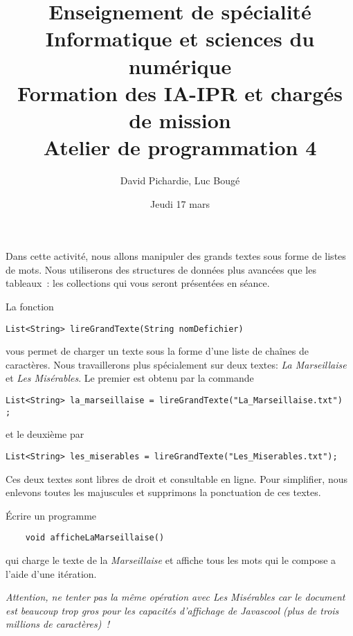 \documentclass[a4paper,11pt]{article}
\newcounter{probleme} \newcounter{question}[probleme]
\def\thequestion{\theprobleme.\arabic{question}}
\newenvironment{question}%
{\refstepcounter{question} \description%
\item[Exercice \thequestion.] \bgroup}%
{\egroup\enddescription}
\newenvironment{remarque}%
{\description\item[Remarque.]\sl}%
{\enddescription}
\begin{document}
\title{Enseignement de spécialité\\
Informatique et sciences du numérique\\
Formation des IA-IPR et chargés de mission\\
Atelier de programmation 4}

\date{Jeudi 17 mars}

\author{David Pichardie, Luc Bougé}
\maketitle

Dans cette activité, nous allons manipuler des grands textes sous
forme de listes de mots. Nous utiliserons des structures de données
plus avancées que les tableaux~: les collections qui vous seront
présentées en séance.
  
La fonction 
\begin{lstlisting}
List<String> lireGrandTexte(String nomDefichier)
\end{lstlisting}
vous permet de
charger un texte sous la forme d'une liste de chaînes de
caractères. Nous travaillerons plus spécialement sur deux textes:
\emph{La Marseillaise} et \emph{Les Misérables}. Le premier est obtenu
par la commande
\begin{lstlisting}
List<String> la_marseillaise = lireGrandTexte("La_Marseillaise.txt")  ;
\end{lstlisting}
et le deuxième par 
\begin{lstlisting}
List<String> les_miserables = lireGrandTexte("Les_Miserables.txt");
\end{lstlisting}
Ces deux textes sont libres de droit et consultable en ligne. Pour
simplifier, nous enlevons toutes les majuscules et supprimons la ponctuation
de ces textes.

\begin{question}
  Écrire un programme 
  \begin{lstlisting}
    void afficheLaMarseillaise()
  \end{lstlisting}
qui charge le texte de la \emph{Marseillaise} et affiche tous les mots qui le
  compose a l'aide d'une itération. 
\end{question}

\begin{remarque}
  Attention, ne tenter pas la même opération avec \emph{Les
    Misérables} car le document est beaucoup trop gros pour les
  capacités d'affichage de Javascool (plus de trois millions de
  caractères)~!
\end{remarque}
\end{document}
